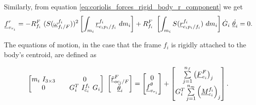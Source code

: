 Similarly, from equation \eqref{eq:coriolis_forces_rigid_body_r_component}
we get 
\[
    \vecd{f}^{r}_{v_{r_i}} = -\rot{R}{f_{i}}{F}\ (S(\pvec{\omega}{f_{i}}{F}{f_i}))^{2}
    \left[\int_{m_i} \pvec{r}{c_{i}p_{i}}{f_i}{f_i}\ dm_{i}\right]
    + \rot{R}{f_{i}}{F}\ \left[\int_{m_i} S(\pvec{r}{c_{i}p_{i}}{f_i}{f_i})\ dm_{i}\right] 
    \dot{G}_{i} \ \dot{\vecd{\theta}_{i}} = 0.
\]

The equations of motion, in the case that the frame 
$f_i$ is rigidly attached to the body's centroid, are defined as 

\begin{equation}
    \begin{bmatrix}
        m_{i}\ I_{3 \times 3} && 0 \\ 0 && G^{T}_{i} \ I^{f_i}_{c_i}\ G_i
    \end{bmatrix}\ \begin{bmatrix}
        \pvec{\ddot{r}}{oc_{i}}{F}{F} \\  \vecd{\ddot{\theta}}_{i}
    \end{bmatrix} = 
    \begin{bmatrix}
      0 \\ \vecd{f}^{\theta}_{v_{r_i}} 
    \end{bmatrix} 
    + \begin{bmatrix}
        \sum\limits_{j=1}^{n_f}\left(\vecd{F}^{F}_{e_i}\right)_j 
        \\ G^{T}_{i} \sum\limits_{j=1}^{n_m}\left(\vecd{M}_{c_i}^{f_i}\right)_j 
    \end{bmatrix}.
    \label{eq:}
\end{equation}




